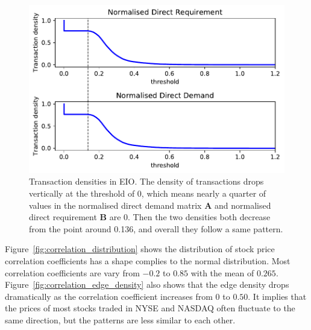 \begin{figure}
	\begin{center}
		\includegraphics[width=14cm]{eio_transaction_density}
	\end{center}
	\caption{Transaction densities in EIO. The density of transactions drops vertically at the threshold of 0, which means nearly a quarter of values in the normalised direct demand matrix \textbf{A} and normalised direct requirement \textbf{B} are $0$. Then the two densities both decrease from the point around 0.136, and overall they follow a same pattern.}
	\label{fig:eio_transaction_density}
\end{figure}

Figure~\ref{fig:correlation_distribution} shows the distribution of stock price correlation coefficients has a shape complies to the normal distribution. Most correlation coefficients are vary from $-0.2$ to $0.85$ with the mean of $0.265$. Figure~\ref{fig:correlation_edge_density} also shows that the edge density drops dramatically as the correlation coefficient increases from $0$ to $0.50$. It implies that the prices of most stocks traded in NYSE and NASDAQ often fluctuate to the same direction, but the patterns are less similar to each other.

